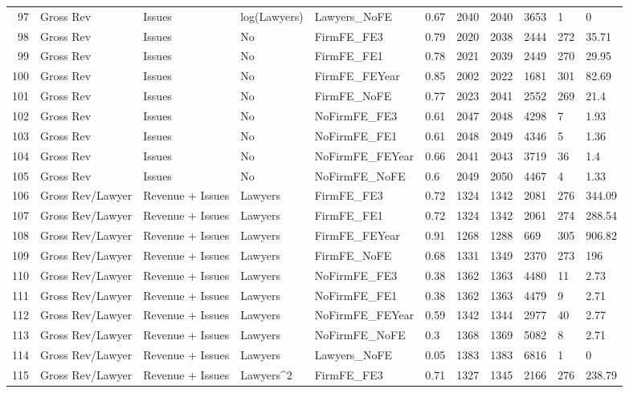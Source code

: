 \documentclass{article}
\begin{document}
\begin{table}[H]
\begin{tabular}{rllllllllll}
  97 & Gross Rev & Issues & log(Lawyers) & Lawyers\_NoFE & 0.67 & 2040 & 2040 & 3653 & 1 & 0 \\ 
  98 & Gross Rev & Issues & No & FirmFE\_FE3 & 0.79 & 2020 & 2038 & 2444 & 272 & 35.71 \\ 
  99 & Gross Rev & Issues & No & FirmFE\_FE1 & 0.78 & 2021 & 2039 & 2449 & 270 & 29.95 \\ 
  100 & Gross Rev & Issues & No & FirmFE\_FEYear & 0.85 & 2002 & 2022 & 1681 & 301 & 82.69 \\ 
  101 & Gross Rev & Issues & No & FirmFE\_NoFE & 0.77 & 2023 & 2041 & 2552 & 269 & 21.4 \\ 
  102 & Gross Rev & Issues & No & NoFirmFE\_FE3 & 0.61 & 2047 & 2048 & 4298 & 7 & 1.93 \\ 
  103 & Gross Rev & Issues & No & NoFirmFE\_FE1 & 0.61 & 2048 & 2049 & 4346 & 5 & 1.36 \\ 
  104 & Gross Rev & Issues & No & NoFirmFE\_FEYear & 0.66 & 2041 & 2043 & 3719 & 36 & 1.4 \\ 
  105 & Gross Rev & Issues & No & NoFirmFE\_NoFE & 0.6 & 2049 & 2050 & 4467 & 4 & 1.33 \\ 
  106 & Gross Rev/Lawyer & Revenue + Issues & Lawyers & FirmFE\_FE3 & 0.72 & 1324 & 1342 & 2081 & 276 & 344.09 \\ 
  107 & Gross Rev/Lawyer & Revenue + Issues & Lawyers & FirmFE\_FE1 & 0.72 & 1324 & 1342 & 2061 & 274 & 288.54 \\ 
  108 & Gross Rev/Lawyer & Revenue + Issues & Lawyers & FirmFE\_FEYear & 0.91 & 1268 & 1288 & 669 & 305 & 906.82 \\ 
  109 & Gross Rev/Lawyer & Revenue + Issues & Lawyers & FirmFE\_NoFE & 0.68 & 1331 & 1349 & 2370 & 273 & 196 \\ 
  110 & Gross Rev/Lawyer & Revenue + Issues & Lawyers & NoFirmFE\_FE3 & 0.38 & 1362 & 1363 & 4480 & 11 & 2.73 \\ 
  111 & Gross Rev/Lawyer & Revenue + Issues & Lawyers & NoFirmFE\_FE1 & 0.38 & 1362 & 1363 & 4479 & 9 & 2.71 \\ 
  112 & Gross Rev/Lawyer & Revenue + Issues & Lawyers & NoFirmFE\_FEYear & 0.59 & 1342 & 1344 & 2977 & 40 & 2.77 \\ 
  113 & Gross Rev/Lawyer & Revenue + Issues & Lawyers & NoFirmFE\_NoFE & 0.3 & 1368 & 1369 & 5082 & 8 & 2.71 \\ 
  114 & Gross Rev/Lawyer & Revenue + Issues & Lawyers & Lawyers\_NoFE & 0.05 & 1383 & 1383 & 6816 & 1 & 0 \\ 
  115 & Gross Rev/Lawyer & Revenue + Issues & Lawyers^2 & FirmFE\_FE3 & 0.71 & 1327 & 1345 & 2166 & 276 & 238.79 \\ 

\end{tabular}
\end{table}
\end{document}
